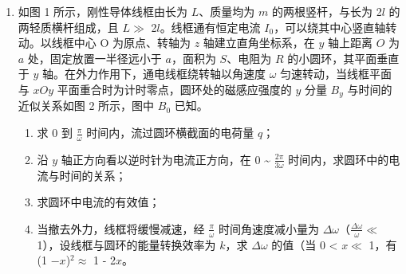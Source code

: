 \documentclass[\gkver]{gaokaozhenti}
\begin{document}
\begin{enumerate}
{（2）设滑块刚滑上摆渡车时的速度大小为 v，从静止释放到 G 点过程，根据动能定理可得

 $mgh - 0.2mgL_{FG} = \frac{1}{2}mv^{2}$

解得  $v = 6 \, \Ums$

摆渡车碰到 IJ 前，滑块恰好不脱离摆渡车，说明滑块到达摆渡车右端时刚好与摆渡车共速  $v_{1}$，以滑块和摆渡车为系统，根据系统动量守恒可得

 $mv = 2mv_{1}$

解得  $v_{1}=\frac{v}{2}=3\Ums$

根据能量守恒可得

 $Q=\mu mgL=\frac{1}{2}mv^{2}-\frac{1}{2}\times2mv_{1}^{2}$

解得  $\mu = 0.3$

（3）滑块从滑上摆渡车到与摆渡车共速过程，滑块的加速度大小为

 $a=\frac{\mu mg}{m}=3\Umsq$

所用时间为

 $t_{1}=\frac{v-v_{1}}{a}=1\Us$

此过程滑块通过的位移为

 $x_{1}=\frac{v+v_{1}}{2}t_{1}=4.5\Um$

滑块与摆渡车共速后，滑块与摆渡车一起做匀速直线运动，该过程所用时间为
$$ t_{2}=\frac{L_{0}-x_{1}}{v_{1}}=1.5\Us $$

则滑块从 G 到 J 所用的时间为

 $t = t_{1} + t_{2} = 2.5\Us$
}

\item
如图 1 所示，刚性导体线框由长为 $L$、质量均为 $m$ 的两根竖杆，与长为 2$l$ 的两轻质横杆组成，且 $L \gg$ 2$l$。线框通有恒定电流 $I_{0}$，可以绕其中心竖直轴转动。以线框中心 O 为原点、转轴为 $z$ 轴建立直角坐标系，在 $y$ 轴上距离 $O$ 为 $a$ 处，固定放置一半径远小于 $a$，面积为 $S$、电阻为 $R$ 的小圆环，其平面垂直于 $y$ 轴。在外力作用下，通电线框绕转轴以角速度 $\omega$ 匀速转动，当线框平面与 $xOy$ 平面重合时为计时零点，圆环处的磁感应强度的 $y$ 分量 $B_{y}$ 与时间的近似关系如图 2 所示，图中 $B_{0}$ 已知。
\begin{enumerate}
	\item
	求 0 到 $\frac{\pi }{\omega }$ 时间内，流过圆环横截面的电荷量 $q$；
	\item
	沿 $y$ 轴正方向看以逆时针为电流正方向，在 0 \textasciitilde{} $\frac{{2\pi }}{{3\omega }}$ 时间内，求圆环中的电流与时间的关系；
	\item
	求圆环中电流的有效值；
	\item
	当撤去外力，线框将缓慢减速，经 $\frac{\pi }{\omega }$ 时间角速度减小量为 $\Delta\omega$（$\frac{{\Delta \omega }}{\omega } \ll$ 1），设线框与圆环的能量转换效率为 $k$，求 $\Delta\omega$ 的值（当 0 < $x \ll$ 1，有 (1 $- x$)$^{2} \approx$ 1 - 2$x$。
\end{enumerate}
\end{enumerate}
\end{document}
